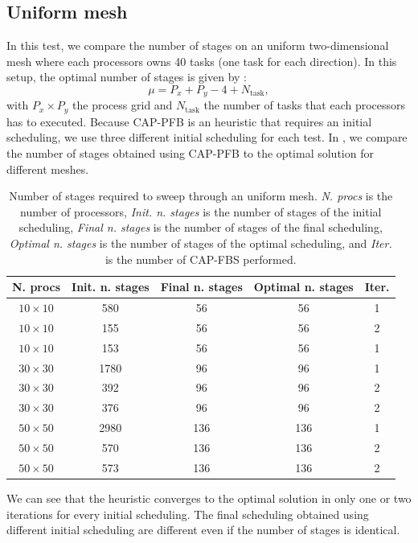 \documentclass[letterpaper]{article}
\renewcommand{\(}{\left(}
\renewcommand{\)}{\right)}
\renewcommand{\[}{\left[}
\renewcommand{\]}{\right]}
\begin{document}
\subsection{Uniform mesh}
In this test, we compare the number of stages on an uniform two-dimensional mesh 
where each processors owns 40 tasks (one task for each direction). In this
setup, the optimal number of stages is given by \cite{Adams2013}:
\begin{equation}
  \mu = P_x + P_y - 4 + N_{\textrm{task}},
\end{equation}
with $P_x \times P_y$ the process grid and $N_{\textrm{task}}$ the number of
tasks that each processors has to executed. Because CAP-PFB
is an heuristic that requires an initial scheduling, we use three different
initial scheduling for each test. In , we compare the number of
stages obtained using CAP-PFB to the optimal solution for different meshes.
\begin{table}[H]
  \begin{center}
    \begin{tabular}{|c|c|c|c|c|}
      \hline
      N. procs & Init. n. stages & Final n. stages & Optimal n. stages & Iter. \\
      \hline
      $10\times 10$ &  580 &  56 &  56 & 1 \\
      $10\times 10$ &  155 &  56 &  56 & 2 \\
      $10\times 10$ &  153 &  56 &  56 & 1 \\
      $30\times 30$ & 1780 &  96 &  96 & 1 \\
      $30\times 30$ &  392 &  96 &  96 & 2 \\
      $30\times 30$ &  376 &  96 &  96 & 2 \\
      $50\times 50$ & 2980 & 136 & 136 & 1 \\
      $50\times 50$ &  570 & 136 & 136 & 2 \\ 
      $50\times 50$ &  573 & 136 & 136 & 2 \\
      \hline
    \end{tabular}
    \caption{Number of stages required to sweep through an uniform mesh.
      \emph{N. procs} is the number of processors, \emph{Init. n. stages} is the
      number of stages of the initial scheduling, \emph{Final n. stages} is the
      number of stages of the final scheduling, \emph{Optimal n. stages} is the
      number of stages of the optimal scheduling, and \emph{Iter.} is the number
    of CAP-FBS performed.}
    \label{uniform}
  \end{center}
\end{table}
We can see that the heuristic converges to the optimal solution in 
only one or two iterations for every initial scheduling. The final scheduling
obtained using different initial scheduling are different even if the number of
stages is identical.
\end{document}
